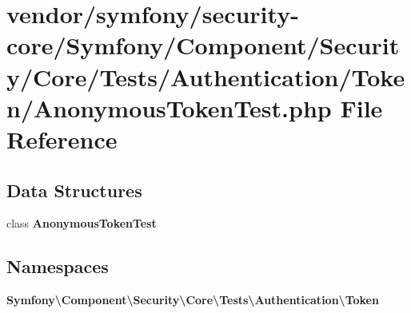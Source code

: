 \section{vendor/symfony/security-\/core/\+Symfony/\+Component/\+Security/\+Core/\+Tests/\+Authentication/\+Token/\+Anonymous\+Token\+Test.php File Reference}
\label{_anonymous_token_test_8php}
\subsection*{Data Structures}
\begin{DoxyCompactItemize}
\item 
class {\bf Anonymous\+Token\+Test}
\end{DoxyCompactItemize}
\subsection*{Namespaces}
\begin{DoxyCompactItemize}
\item 
 {\bf Symfony\textbackslash{}\+Component\textbackslash{}\+Security\textbackslash{}\+Core\textbackslash{}\+Tests\textbackslash{}\+Authentication\textbackslash{}\+Token}
\end{DoxyCompactItemize}
